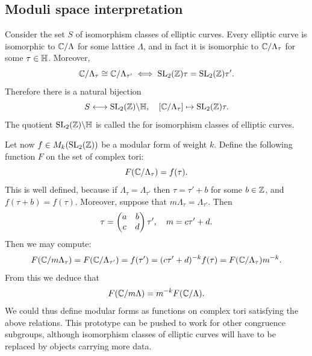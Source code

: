 \subsection{Moduli space interpretation}

Consider the set $S$ of isomorphism classes of elliptic curves. Every elliptic curve is isomorphic to $\mathbb{C}/\Lambda$ for some lattice $\Lambda$, and in fact it is isomorphic to $\mathbb{C}/\Lambda_\tau$ for some $\tau\in\mathbb{H}$. Moreover,
\[
\mathbb{C}/\Lambda_\tau\cong \mathbb{C}/\Lambda_{\tau'}\iff \operatorname{SL}_2(\mathbb{Z})\tau = \operatorname{SL}_2(\mathbb{Z})\tau'.
\]
Therefore there is a natural bijection
\[
S\longleftrightarrow \operatorname{SL}_2(\mathbb{Z})\backslash \mathbb{H},\quad [\mathbb{C}/\Lambda_\tau]\mapsto \operatorname{SL}_2(\mathbb{Z})\tau.
\]
The quotient $\operatorname{SL}_2(\mathbb{Z})\backslash\mathbb{H}$ is called the  for isomorphism classes of elliptic curves.

Let now $f\in M_k(\operatorname{SL}_2(\mathbb{Z}))$ be a modular form of weight $k$. Define the following function $F$ on the set of complex tori:
\[
F(\mathbb{C}/\Lambda_\tau) = f(\tau).
\]
This is well defined, because if $\Lambda_\tau=\Lambda_{\tau'}$ then $\tau=\tau'+b$ for some $b\in\mathbb{Z}$, and $f(\tau+b)=f(\tau)$. Moreover, suppose that $m\Lambda_\tau=\Lambda_{\tau'}$. Then
\[
\tau=\left(\begin{matrix}a&b\\c&d\end{matrix}\right) \tau',\quad m=c\tau'+d.
\]
Then we may compute:
\[
F(\mathbb{C}/m\Lambda_\tau)=F(\mathbb{C}/\Lambda_{\tau'}) = f(\tau')=(c\tau'+d)^{-k}f(\tau)=F(\mathbb{C}/\Lambda_\tau)m^{-k}.
\]
From this we deduce that
\[
F(\mathbb{C}/m\Lambda) = m^{-k}F(\mathbb{C}/\Lambda).
\]
We could thus define modular forms as functions on complex tori satisfying the above relations. This prototype can be pushed to work for other congruence subgroups, although isomorphism classes of elliptic curves will have to be replaced by objects carrying more data.

